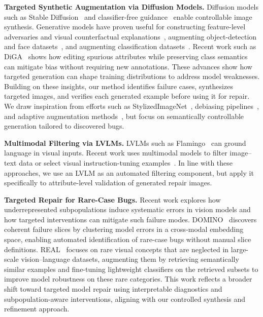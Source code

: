 \documentclass[10pt]{article} %
\begin{document}
\noindent\textbf{Targeted Synthetic Augmentation via Diffusion Models.}
Diffusion models such as Stable Diffusion~\citep{rombach2022high} and classifier-free guidance~\citep{ho2022classifierfree} enable controllable image synthesis. Generative models have proven useful for constructing feature-level adversaries and visual counterfactual explanations~\citep{casper2022robust,augustin2022diffusion,boreiko2022sparse}, augmenting object-detection and face datasets~\citep{fang2024data,huang2024data}, and augmenting classification datasets~\citep{trabucco2023effective,dunlap2023diversify}. Recent work such as DiGA~\citep{zhang2024distributionally} shows how editing spurious attributes while preserving class semantics can mitigate bias without requiring new annotations. These advances show how targeted generation can shape training distributions to address model weaknesses. Building on these insights, our method identifies failure cases, synthesizes targeted images, and verifies each generated example before using it for repair. We draw inspiration from efforts such as StylizedImageNet~\citep{geirhos2019imagenet}, debiasing pipelines~\citep{jin2021background}, and adaptive augmentation methods~\citep{mikolajczyk2023targeted,zhao2022adaptive,wang2024domain}, but focus on semantically controllable generation tailored to discovered bugs.

\noindent\textbf{Multimodal Filtering via LVLMs.} LVLMs such as Flamingo~\citep{alayrac2022flamingo} can ground language in visual inputs. Recent work uses multimodal models to filter image--text data or select visual instruction-tuning examples~\citep{wang2024finetuned,chen2024self}. In line with these approaches, we use an LVLM as an automated filtering component, but apply it specifically to attribute-level validation of generated repair images.

\noindent\textbf{Targeted Repair for Rare-Case Bugs.}  
Recent work explores how underrepresented subpopulations induce systematic errors in vision models and how targeted interventions can mitigate such failure modes. DOMINO~\citep{eyuboglu2022rare} discovers coherent failure slices by clustering model errors in a cross‑modal embedding space, enabling automated identification of rare-case bugs without manual slice definitions.
REAL~\citep{parashar2024neglected} focuses on rare visual concepts that are neglected in large-scale vision--language datasets, augmenting them by retrieving semantically similar examples and fine-tuning lightweight classifiers on the retrieved subsets to improve model robustness on these rare categories.
This work reflects a broader shift toward targeted model repair using interpretable diagnostics and subpopulation-aware interventions, aligning with our controlled synthesis and refinement approach.
\end{document}
